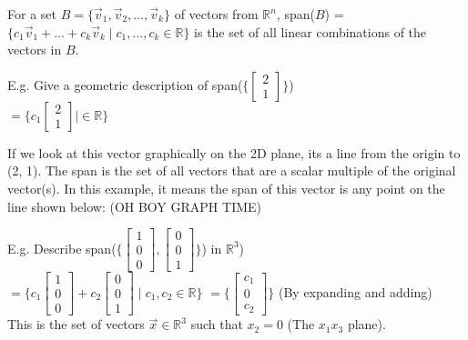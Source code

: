 \documentclass{letter}
\begin{document}
	For a set $B = \{ \vec v_1, \vec v_2, \dots, \vec v_k \}$ of vectors from $\mathbb{R}^n$, span($B$) = $\{ c_1 \vec v_1 + \dots + c_k \vec v_k \mid c_1, \dots, c_k \in \mathbb{R} \}$ is the set of all linear combinations of the vectors in $B$.
	
	E.g. Give a geometric description of span($\{ \begin{bmatrix}2\\1\end{bmatrix} \}$)\\
	$= \{ c_1\begin{bmatrix}2\\1\end{bmatrix} \mid \in \mathbb{R} \}$
	
	If we look at this vector graphically on the 2D plane, its a line from the origin to (2, 1). The span is the set of all vectors that are a scalar multiple of the original vector(s). In this example, it means the span of this vector is any point on the line shown below: (OH BOY GRAPH TIME)
	\begin{center}
	\end{center}
	E.g. Describe span($\{ \begin{bmatrix}1\\0\\0\end{bmatrix}, \begin{bmatrix}0\\0\\1\end{bmatrix} \}$) in $\mathbb{R}^3$)\\
	$= \{ c_1 \begin{bmatrix}1\\0\\0\end{bmatrix}+ c_2 \begin{bmatrix}0\\0\\1\end{bmatrix} \mid c_1, c_2 \in \mathbb{R} \}$ 
	$= \{ \begin{bmatrix}c_1\\0\\c_2\end{bmatrix} \}$ (By expanding and adding)\\
	This is the set of vectors $\vec x \in \mathbb{R}^3$ such that $x_2 = 0$ (The $x_1x_3$ plane).
	\clearpage
	
\end{document}
